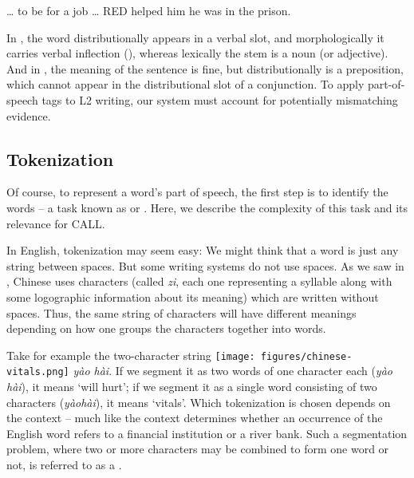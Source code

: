 \ea \ea \label{ex:choiced} {\ldots} to be  for a job {\ldots}
  \ex \label{ex:during} RED helped him  he was in the prison.
\z
\z 

In , the word  distributionally
appears in a verbal slot, and morphologically it carries verbal
inflection (), whereas lexically the stem
 is a noun (or adjective).  And in , the
meaning of the sentence is fine, but  distributionally
is a preposition, which cannot appear in the distributional slot of a
conjunction. To apply part-of-speech tags to L2 writing, our system must account for potentially mismatching evidence.



\subsection{Tokenization} \label{sec:tokenize}

Of course, to represent a word's part of speech, the first step is to identify the words -- a task known as  or .  Here, we describe the complexity of this task and its relevance for CALL.

In English, tokenization may seem easy: We might think that a word is just any string between spaces.  But some writing systems do not use spaces.  As we saw in , Chinese uses characters (called \emph{zi}, each one representing a syllable along with some logographic information about its meaning) which are written without spaces.  Thus, the same string of characters will have different meanings depending on how one groups the characters together into words. 


Take for example the two-character string
\texttt{[image: figures/chinese-vitals.png]} \textit{y\`ao h\`ai}.  If we segment it as two words of one character each (\textit{y\`ao h\`ai}), it means `will
hurt'; if we segment it as a single word consisting of two characters (\textit{y\`aoh\`ai}),
it means `vitals'. Which tokenization is chosen depends on the context
-- much like the context determines whether an occurrence of the
English word  refers to a financial institution or a
river bank. Such a segmentation problem, where two or more characters
may be combined to form one word or not, is referred to as a
.



